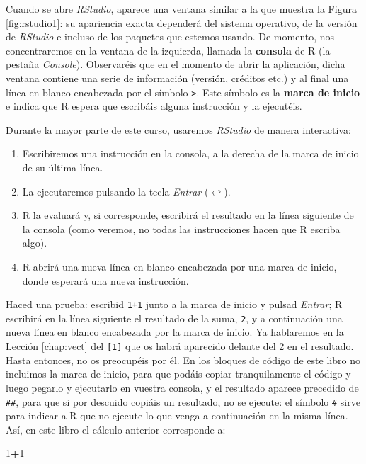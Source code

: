 \documentclass[]{book}
\newenvironment{Shaded}{\begin{snugshade}}{\end{snugshade}}
\newcommand{\DecValTok}[1]{\textcolor[rgb]{0.00,0.00,0.81}{#1}}
\newcommand{\OperatorTok}[1]{\textcolor[rgb]{0.81,0.36,0.00}{\textbf{#1}}}
\providecommand{\tightlist}{%
  \setlength{\itemsep}{0pt}\setlength{\parskip}{0pt}}
\theoremstyle{definition}
\theoremstyle{definition}
\theoremstyle{definition}
\theoremstyle{remark}
\begin{document}
Cuando se abre \emph{RStudio}, aparece una ventana similar a la que muestra la Figura \ref{fig:rstudio1}: su apariencia exacta dependerá del sistema operativo, de la versión de \emph{RStudio} e incluso de los paquetes que estemos usando. De momento, nos concentraremos en la ventana de la izquierda, llamada la \textbf{consola} de R (la pestaña \emph{Console}). Observaréis que en el momento de abrir la aplicación, dicha ventana contiene una serie de información (versión,
créditos etc.) y al final una línea en blanco encabezada por el símbolo \texttt{\textgreater{}}. Este símbolo es la \textbf{marca de inicio} e indica que R espera que escribáis alguna instrucción y la ejecutéis.

Durante la mayor parte de este curso, usaremos \emph{RStudio} de manera interactiva:

\begin{enumerate}
\def\labelenumi{\arabic{enumi}.}
\tightlist
\item
  Escribiremos una instrucción en la consola, a la derecha de la marca de inicio de su última línea.
\item
  La ejecutaremos pulsando la tecla \emph{Entrar} (\(\hookleftarrow\)).
\item
  R la evaluará y, si corresponde, escribirá el resultado en la línea siguiente de la consola (como veremos, no todas las instrucciones hacen que R escriba algo).
\item
  R abrirá una nueva línea en blanco encabezada por una marca de inicio, donde esperará una nueva instrucción.
\end{enumerate}

Haced una prueba: escribid \texttt{1+1} junto a la marca de inicio y pulsad \emph{Entrar}; R escribirá en la línea siguiente el resultado de la suma, \texttt{2}, y a continuación una nueva línea en blanco encabezada por la marca de inicio.
Ya hablaremos en la Lección \ref{chap:vect} del \texttt{{[}1{]}} que os habrá aparecido delante del 2 en el resultado. Hasta entonces, no os preocupéis por él. En los bloques de código de este libro no incluimos la marca de inicio, para que podáis copiar tranquilamente el código y luego pegarlo y ejecutarlo en vuestra consola, y el resultado aparece precedido de \texttt{\#\#}, para que si por descuido copiáis un resultado, no se ejecute: el símbolo \texttt{\#} sirve para indicar a R que no ejecute lo que venga a continuación en la misma línea. Así, en este libro el cálculo anterior corresponde a:

\begin{Shaded}
\begin{Highlighting}[]
\DecValTok{1}\OperatorTok{+}\DecValTok{1}
\end{Highlighting}
\end{Shaded}
\end{document}
